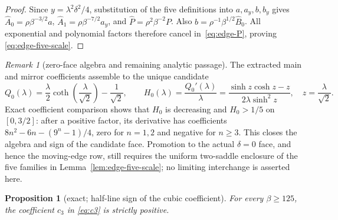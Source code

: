 \documentclass[11pt]{article}
\newtheorem{proposition}[theorem]{Proposition}
\theoremstyle{remark}
\newtheorem{remark}[theorem]{Remark}
\begin{document}
\begin{proof}
Since $y=\lambda^2\delta^2/4$, substitution of the five definitions into
$a,a_y,b,b_y$ gives
$\widehat A_0=\rho\beta^{-3/2}a$,
$\widehat A_1=\rho\beta^{-7/2}a_y$, and
$\widehat P=\rho^2\beta^{-2}P$.  Also
$b=\rho^{-1}\beta^{1/2}\widehat B_0$.  All exponential and polynomial
factors therefore cancel in~\eqref{eq:edge-P}, proving
\eqref{eq:edge-five-scale}.
\end{proof}

\begin{remark}[zero-face algebra and remaining analytic passage]
The extracted main and mirror coefficients assemble to the unique candidate
\[
 Q_0(\lambda)=\frac\lambda2\coth\!\left(\frac\lambda{\sqrt2}\right)
 -\frac1{\sqrt2},\qquad
 H_0(\lambda)=\frac{Q_0'(\lambda)}{\lambda}
 =\frac{\sinh z\cosh z-z}{2\lambda\sinh^2z},\quad
 z=\frac\lambda{\sqrt2}.
\]
Exact coefficient comparison shows that $H_0$ is decreasing and
$H_0>1/5$ on $[0,3/2]$: after a positive factor, its derivative has
coefficients
$8n^2-6n-(9^n-1)/4$, zero for $n=1,2$ and negative for $n\ge3$.
This closes the algebra and sign of the candidate face.  Promotion to the
actual $\delta=0$ face, and hence the moving-edge row, still requires the
uniform two-saddle enclosure of the five families in
Lemma~\ref{lem:edge-five-scale}; no limiting interchange is asserted here.
\end{remark}

\begin{proposition}[exact; half-line sign of the cubic coefficient]
\label{prop:c3halfline}
For every $\beta\ge125$, the coefficient $c_3$ in \eqref{eq:c3} is
strictly positive.
\end{proposition}
\end{document}
